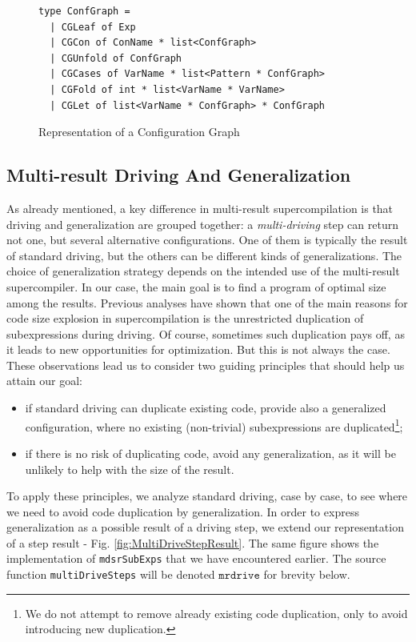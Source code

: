 \documentclass[submission,copyright,creativecommons]{eptcs}
\begin{document}
\begin{figure}
\begin{lstlisting}
type ConfGraph =
  | CGLeaf of Exp
  | CGCon of ConName * list<ConfGraph>
  | CGUnfold of ConfGraph
  | CGCases of VarName * list<Pattern * ConfGraph>
  | CGFold of int * list<VarName * VarName>
  | CGLet of list<VarName * ConfGraph> * ConfGraph
\end{lstlisting}
\caption{Representation of a Configuration Graph}
\label{fig:ConfGraph}
\end{figure}

\subsection{Multi-result Driving And Generalization}\label{sec:MRDriving}

As already mentioned, a key difference in multi-result supercompilation is
that driving and generalization are grouped together: a \emph{multi-driving}
step can return not one, but several alternative configurations.
One of them is typically the result of standard driving, but the others
can be different kinds of generalizations.
The choice of generalization strategy depends on the intended use of the
multi-result supercompiler.
In our case, the main goal is to find a program of optimal size among the results.
Previous analyses have shown that one of the main reasons for code size explosion in
supercompilation is the unrestricted duplication of subexpressions during driving.
Of course, sometimes such duplication pays off, as it leads to new opportunities 
for optimization.
But this is not always the case.
These observations lead us to consider two guiding principles that should help us attain our goal:
\begin{itemize}
  \item if standard driving can duplicate existing code, provide also a generalized
    configuration, where no existing (non-trivial) subexpressions are duplicated\footnote{
    We do not attempt to remove already existing code duplication, 
    only to avoid introducing new duplication.};
  \item if there is no risk of duplicating code, avoid any generalization, as it will
    be unlikely to help with the size of the result.
\end{itemize}
To apply these principles, we analyze standard driving, case by case, to see where
we need to avoid code duplication by generalization.
In order to express generalization as a possible result of a driving step,
we extend our representation of a step result - Fig. \ref{fig:MultiDriveStepResult}.
The same figure shows the implementation of \verb|mdsrSubExps| that we have encountered earlier.
The source function \verb|multiDriveSteps| will be denoted $\mathtt{mrdrive}$ for brevity below.
\end{document}
